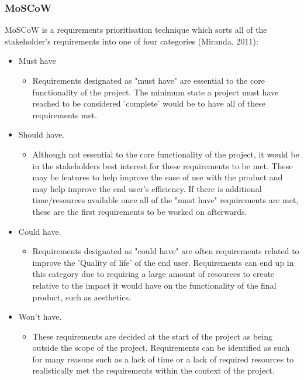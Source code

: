 \documentclass[12pt,a4paper]{article}
\begin{document}
\subsubsection{MoSCoW}

MoSCoW is a requirements prioritisation technique which sorts all of the stakeholder's requirements into one of four categories (Miranda, 2011):

\begin{itemize}
    \item Must have
    \begin{itemize}
        \item Requirements designated as "must have" are essential to the core functionality of the project. The minimum state a project must have reached to be considered 'complete' would be to have all of these requirements met.
    \end{itemize}
    \item Should have.
    \begin{itemize}
        \item Although not essential to the core functionality of the project, it would be in the stakeholders best interest for these requirements to be met. These may be features to help improve the ease of use with the product and may help improve the end user's efficiency. If there is additional time/resources available once all of the "must have" requirements are met, these are the first requirements to be worked on afterwards.
    \end{itemize}
    \item Could have.
    \begin{itemize}
        \item Requirements designated as "could have" are often requirements related to improve the 'Quality of life' of the end user. Requirements can end up in this category due to requiring a large amount of resources to create relative to the impact it would have on the functionality of the final product, such as aesthetics.
    \end{itemize}
    \item Won't have.
    \begin{itemize}
        \item These requirements are decided at the start of the project as being outside the scope of the project. Requirements can be identified as such for many reasons such as a lack of time or a lack of required resources to realistically met the requirements within the context of the project.
    \end{itemize}
\end{itemize}
\end{document}
